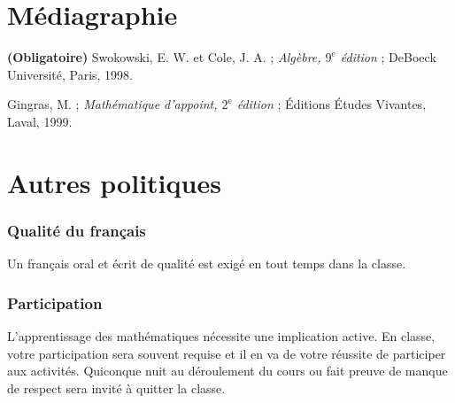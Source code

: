 \documentclass[fleqn,twoside,12pt,letterpaper]{article}
\begin{document}
\section{Médiagraphie}

{\bf (Obligatoire)}
Swokowski, E. W. et Cole, J. A. ; \emph{Algèbre, $9^{\text{e}}$ édition} ; DeBoeck Université, Paris, 1998.

Gingras, M. ; \emph{Mathématique d'appoint, $2^{\text{e}}$ édition} ; Éditions Études Vivantes, Laval, 1999.


\section{Autres politiques}

\subsubsection{Qualité du français}
Un français oral et écrit de qualité est exigé en tout temps dans la classe.

\subsubsection{Participation}
L'apprentissage des mathématiques nécessite une implication active. En classe, votre participation sera souvent requise et il en va de votre réussite de participer aux activités. Quiconque nuit au déroulement du cours ou fait preuve de manque de respect sera invité à quitter la classe.
\end{document}
